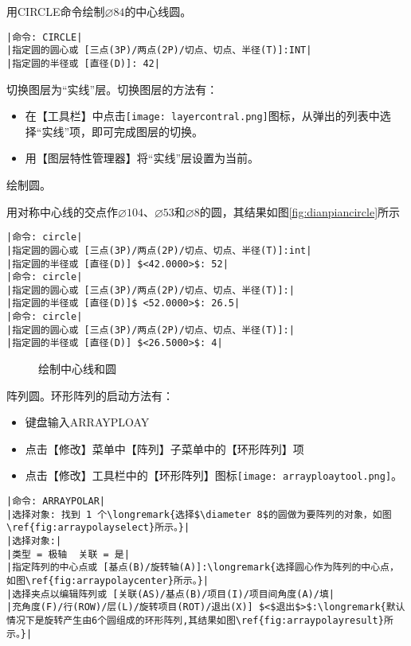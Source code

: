 \begin{procedure}
用CIRCLE命令绘制$\diameter 84$的中心线圆。
\begin{lstlisting}
|命令: CIRCLE|
|指定圆的圆心或 [三点(3P)/两点(2P)/切点、切点、半径(T)]:INT|
|指定圆的半径或 [直径(D)]: 42|
\end{lstlisting}
\item 切换图层为“实线”层。切换图层的方法有：
\begin{itemize}
\item 在【工具栏】中点击\texttt{[image: layercontral.png]}图标，从弹出的列表中选择“实线”项，即可完成图层的切换。
\item 用【图层特性管理器】将“实线”层设置为当前。
\end{itemize}
\item 绘制圆。

用对称中心线的交点作$\diameter 104$、$\diameter 53$和$\diameter 8$的圆，其结果如图\ref{fig:dianpiancircle}所示
\begin{lstlisting}
|命令: circle|
|指定圆的圆心或 [三点(3P)/两点(2P)/切点、切点、半径(T)]:int|
|指定圆的半径或 [直径(D)] $<42.0000>$: 52|
|命令: circle|
|指定圆的圆心或 [三点(3P)/两点(2P)/切点、切点、半径(T)]:|
|指定圆的半径或 [直径(D)]$ <52.0000>$: 26.5|
|命令: circle|
|指定圆的圆心或 [三点(3P)/两点(2P)/切点、切点、半径(T)]:|
|指定圆的半径或 [直径(D)] $<26.5000>$: 4|
\end{lstlisting}

\begin{figure}[htbp]
\centering
{}\hspace{20pt}
\caption{绘制中心线和圆}
\end{figure}
\item 阵列圆。环形阵列的启动方法有：
\begin{itemize}
\item 键盘输入ARRAYPLOAY
\item 点击【修改】菜单中【阵列】子菜单中的【环形阵列】项
\item 点击【修改】工具栏中的【环形阵列】图标\texttt{[image: arrayploaytool.png]}。
\end{itemize}
\begin{lstlisting}
|命令: ARRAYPOLAR|
|选择对象: 找到 1 个\longremark{选择$\diameter 8$的圆做为要阵列的对象，如图\ref{fig:arraypolayselect}所示。}|
|选择对象:|
|类型 = 极轴  关联 = 是|
|指定阵列的中心点或 [基点(B)/旋转轴(A)]:\longremark{选择圆心作为阵列的中心点，如图\ref{fig:arraypolaycenter}所示。}|
|选择夹点以编辑阵列或 [关联(AS)/基点(B)/项目(I)/项目间角度(A)/填|
|充角度(F)/行(ROW)/层(L)/旋转项目(ROT)/退出(X)] $<$退出$>$:\longremark{默认情况下是旋转产生由6个圆组成的环形阵列,其结果如图\ref{fig:arraypolayresult}所示。}|
\end{lstlisting}
\end{procedure}
